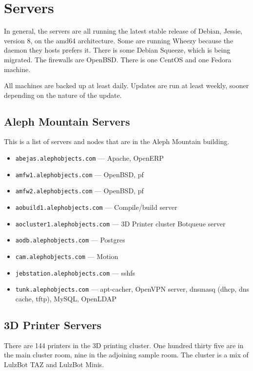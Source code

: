 %
%
%
%
%

\section{Servers}
In general, the servers are all running the latest stable release of Debian,
Jessie, version 8, on the amd64 architecture. Some are running Wheezy because
the daemon they hosts prefers it. There is some Debian Squeeze, which is being
migrated. The firewalls are OpenBSD. There is one CentOS and one Fedora
machine.

All machines are backed up at least daily. Updates are run at least weekly,
sooner depending on the nature of the update.

\subsection{Aleph Mountain Servers}
This is a list of servers and nodes that are in the Aleph Mountain building.

\begin{itemize}
\item \texttt{abejas.alephobjects.com} --- Apache, OpenERP
\item \texttt{amfw1.alephobjects.com} --- OpenBSD, pf
\item \texttt{amfw2.alephobjects.com} --- OpenBSD, pf
\item \texttt{aobuild1.alephobjects.com} --- Compile/build server
\item \texttt{aocluster1.alephobjects.com} --- 3D Printer cluster Botqueue
       server
\item \texttt{aodb.alephobjects.com} --- Postgres
\item \texttt{cam.alephobjects.com} --- Motion
\item \texttt{jebstation.alephobjects.com} --- sshfs
\item \texttt{tunk.alephobjects.com} --- apt-cacher, OpenVPN server, dnsmasq
      (dhcp, dns cache, tftp), MySQL, OpenLDAP
\end{itemize}

\subsection{3D Printer Servers}
There are 144 printers in the 3D printing cluster. One hundred thirty five are
in the main cluster room, nine in the adjoining sample room. The cluster is a
mix of LulzBot TAZ and LulzBot Minis.

